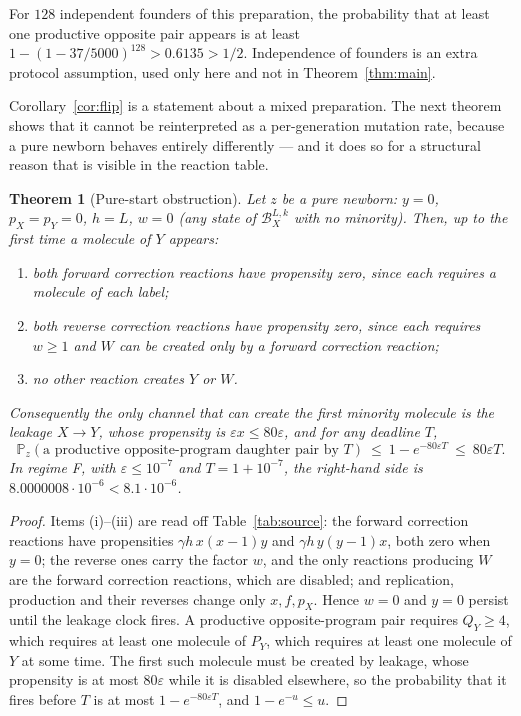 \documentclass[11pt,a4paper]{article}
\theoremstyle{plain}
\newtheorem{theorem}{Theorem}[section]
\theoremstyle{definition}
\theoremstyle{remark}
\newcommand{\Prob}{\mathbb P}
\newcommand{\B}{\mathcal B}
\newcommand{\eps}{\varepsilon}
\begin{document}
For $128$ independent founders of this preparation, the probability that at least one
productive opposite pair appears is at least $1-(1-37/5000)^{128}>0.6135>1/2$.
Independence of founders is an extra protocol assumption, used only here and not in
Theorem~\ref{thm:main}.

Corollary~\ref{cor:flip} is a statement about a mixed preparation. The next theorem shows
that it cannot be reinterpreted as a per-generation mutation rate, because a pure newborn
behaves entirely differently --- and it does so for a structural reason that is visible in
the reaction table.

\begin{theorem}[Pure-start obstruction]\label{thm:pure}
Let $z$ be a pure newborn: $y=0$, $p_X=p_Y=0$, $h=L$, $w=0$ (any state of
$\B_X^{L,k}$ with no minority). Then, up to the first time a molecule of $Y$ appears:
\begin{enumerate}[label=(\roman*),leftmargin=2.2em]
\item both forward correction reactions have propensity zero, since each requires a
  molecule of each label;
\item both reverse correction reactions have propensity zero, since each requires $w\ge1$
  and $W$ can be created only by a forward correction reaction;
\item no other reaction creates $Y$ or $W$.
\end{enumerate}
Consequently the only channel that can create the first minority molecule is the leakage
$X\to Y$, whose propensity is $\eps x\le 80\eps$, and for any deadline $T$,
\begin{equation}
\Prob_z(\text{a productive opposite-program daughter pair by }T)\ \le\
1-e^{-80\eps T}\ \le\ 80\eps T .\label{eq:purebound}
\end{equation}
In regime F, with $\eps\le10^{-7}$ and $T=1+10^{-7}$, the right-hand side is
$8.0000008\cdot10^{-6}<8.1\cdot10^{-6}$.
\end{theorem}

\begin{proof}
Items (i)--(iii) are read off Table~\ref{tab:source}: the forward correction reactions
have propensities $\gamma h\,x(x-1)y$ and $\gamma h\,y(y-1)x$, both zero when $y=0$; the
reverse ones carry the factor $w$, and the only reactions producing $W$ are the forward
correction reactions, which are disabled; and replication, production and their reverses
change only $x,f,p_X$. Hence $w=0$ and $y=0$ persist until the leakage clock fires. A
productive opposite-program pair requires $Q_Y\ge4$, which requires at least one molecule
of $P_Y$, which requires at least one molecule of $Y$ at some time. The first such
molecule must be created by leakage, whose propensity is at most $80\eps$ while it is
disabled elsewhere, so the probability that it fires before $T$ is at most
$1-e^{-80\eps T}$, and $1-e^{-u}\le u$.
\end{proof}
\end{document}
